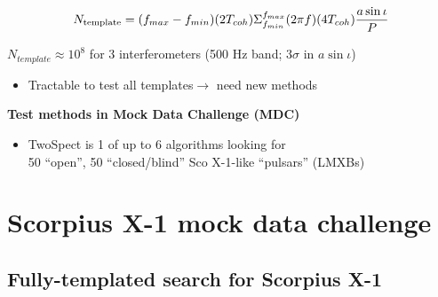 \[
N_{\textup{{template}}}=(f_{max}-f_{min})(2T_{coh}){\displaystyle \Sigma}_{f_{min}}^{f_{max}}(2\pi f)(4T_{coh})\frac{a\sin\iota}{P}
\]



$N_{template}\approx10^{8}$ for 3 interferometers (500 Hz band; $3\sigma$
in $a\sin\iota$)$ $
\begin{itemize}
\item Tractable to test all templates$\rightarrow$ need new methods
\end{itemize}

\textbf{Test methods in Mock Data Challenge (MDC)}
\begin{itemize}
\item TwoSpect is 1 of up to 6 algorithms looking for \\
50 ``open'', 50 ``closed/blind'' Sco X-1-like ``pulsars'' (LMXBs)
\end{itemize}

\section{Scorpius X-1 mock data challenge}
\subsection{Fully-templated search for Scorpius X-1}


